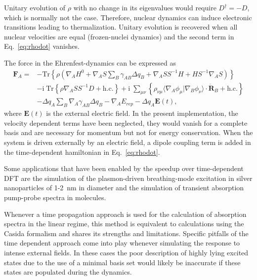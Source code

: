 \documentclass{revtex4-1}
\begin{document}
Unitary evolution of $\rho$ with no change in its eigenvalues would require
$D^\dagger = -D$, which is normally not the case. Therefore, nuclear dynamics
can induce electronic transitions leading to
thermalization.\cite{Lin2009d} Unitary evolution is recovered when all nuclear
velocities are equal (frozen-nuclei dynamics) and the second term in
Eq.~\ref{eq:rhodot} vanishes.

The force in the Ehrenfest-dynamics can be expressed
as\cite{Todorov:2001ex,Niehaus:2005da}
%
\begin{align}
  \mathbf{F}_A =& -\mathrm{Tr} \left\{ \rho \left( \nabla_A H^0 + \nabla_A S
  \sum_B \gamma_{AB} \Delta q_B + \nabla_A S S^{-1} H + H S^{-1} \nabla_A S
  \right) \right\} \nonumber \\ &- \mathrm{i} \; \mathrm{Tr} \left\{ \rho
  \nabla_A S S^{-1} D + \mathrm{h.c.} \right\} + \mathrm{i} \; \sum_{\mu \nu}
  \left\{ \rho_{\nu \mu} \langle \nabla_A \phi_{\mu} | \nabla_B \phi_{\nu}
  \rangle \cdot \dot{\mathbf{R}}_B + \mathrm{h.c.} \right\} \nonumber \\ &-
  \Delta q_A \sum_{B} \nabla_A \gamma_{AB} \Delta q_B - \nabla_A E_{rep} -
  \Delta q_A \mathbf{E}(t),
  \label{eq:ehrenforces}
\end{align}
where $\mathbf{E}(t)$ is the external electric field. In the present
implementation, the velocity dependent terms have been neglected, they would
vanish for a complete basis \cite{Niehaus:2005da} and are necessary for momentum
but not for energy conservation.\cite{Todorov:2001ex}  When the system is
driven externally by an electric field, a dipole coupling term is added in the
time-dependent hamiltonian in Eq.~\ref{eq:rhodot}.

Some applications that have been enabled by the speedup over time-dependent DFT
are the simulation of the plasmon-driven breathing-mode excitation in silver
nanoparticles of 1-2~nm in diameter \cite{Bonafe2017a} and the simulation of
transient absorption pump-probe spectra in
molecules.\cite{Bonafe2018,Hernandez2019}

Whenever a time propagation approach is used for the calculation of absorption
spectra in the linear regime, this method is equivalent to calculations using
the Casida formalism and shares its strengths and limitations. Specific pitfalls
of the time dependent approach come into play whenever simulating the response
to intense external fields. In these cases the poor description of highly lying
excited states due to the use of a minimal basis set would likely be inaccurate
if these states are populated during the dynamics.
\end{document}
